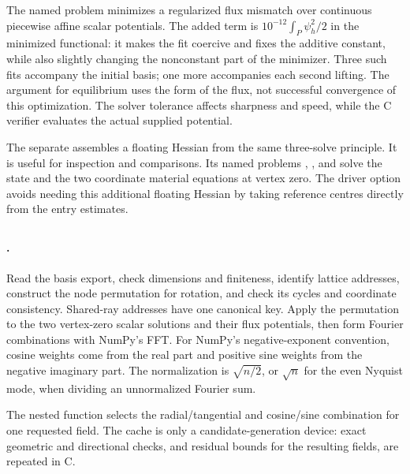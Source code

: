 The named problem  minimizes a regularized flux mismatch over
continuous piecewise affine scalar potentials. The added term is
$10^{-12}\int_P\psi_h^2/2$ in the minimized functional: it makes the fit
coercive and fixes the additive constant, while also slightly changing the
nonconstant part of the minimizer. Three such fits accompany the initial basis;
one more accompanies each second lifting. The argument for equilibrium
uses the form of the flux, not successful convergence of this optimization.
The solver tolerance affects sharpness and speed, while the C verifier
evaluates the actual supplied potential.

The separate  assembles a
floating Hessian from the same three-solve principle. It is useful for
inspection and comparisons. Its named problems ,
, and  solve the state and the two
coordinate material equations at vertex zero. The driver option 
avoids needing this additional floating Hessian by taking reference
centres directly from the entry estimates.

\subsection{}
\paragraph{.}
Read the basis export, check dimensions and finiteness, identify lattice
addresses, construct the node permutation for rotation, and check its
cycles and coordinate consistency. Shared-ray addresses have one canonical
key. Apply the permutation to the two vertex-zero scalar solutions and
their flux potentials, then form Fourier combinations with NumPy's FFT.
For NumPy's negative-exponent convention, cosine weights come from the
real part and positive sine weights from the negative imaginary part.
The normalization is $\sqrt{n/2}$, or $\sqrt n$ for the even Nyquist mode,
when dividing an unnormalized Fourier sum.

The nested function  selects the radial/tangential and
cosine/sine combination for one requested field. The cache is only a
candidate-generation device: exact geometric and directional checks,
and residual bounds for the resulting fields, are repeated in C.

\subsection{}
